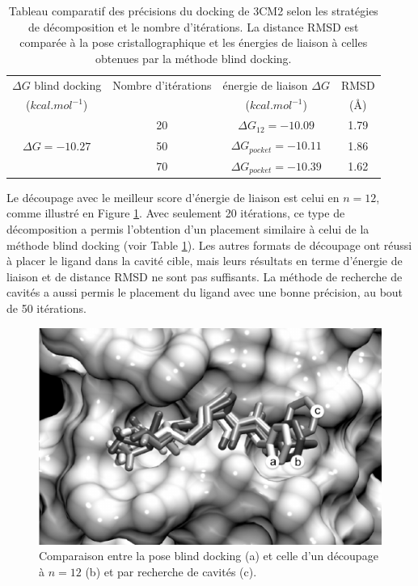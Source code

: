  \begin{table}
 	\begin{center}
 		\caption{Tableau comparatif des précisions du docking de 3CM2 selon les stratégies de décomposition et le nombre d'itérations. La distance RMSD est comparée à la pose cristallographique et les énergies de liaison à celles obtenues par la méthode blind docking.}\label{tab:rmsd}
 		\begin{tabular}{|c|c|c|c|}
 			\hline 
 			$\Delta G$ blind docking & Nombre d'itérations & énergie de liaison $\Delta G$ & RMSD  \\ 
 			($kcal.mol^{-1}$)  &  & ($kcal.mol^{-1}$) &  (\AA{}) \\
 			\hline 
 			\multirow{3}{*}{$\Delta G = -10.27$}  & 20 & $\Delta G_{12} = -10.09$ & 1.79 \\ \cline{2-4}
 			& 50 & $\Delta G_{pocket} = -10.11$ & 1.86 \\ \cline{2-4}
 			& 70 & $\Delta G_{pocket} = -10.39$ & 1.62 \\ \cline{2-4}
 			\hline 
 		\end{tabular} 
 	\end{center}
 	\vspace{-0.3cm}
 \end{table}
 
Le découpage avec le meilleur score d'énergie de liaison est celui en $n = 12$, comme illustré en Figure \ref{fig:cuts}. Avec seulement 20 itérations, ce type de décomposition a permis l'obtention d'un placement similaire à celui de la méthode blind docking (voir Table \ref{tab:rmsd}). Les autres formats de découpage ont réussi à placer le ligand dans la cavité cible, mais leurs résultats en terme d'énergie de liaison et de distance RMSD ne sont pas suffisants. La méthode de recherche de cavités a aussi permis le placement du ligand avec une bonne précision, au bout de 50 itérations. 


 
 \begin{figure}[h]
 	\begin{center}
 		\includegraphics[width=0.85\linewidth]{images/Romain/fig5-bw} 
 		\caption{Comparaison entre la pose blind docking (a) et celle d'un découpage à $n=12$ (b) et par recherche de cavités (c). }\label{fig:cuts}\vspace{-0.3cm}
 	\end{center}
 \end{figure}

